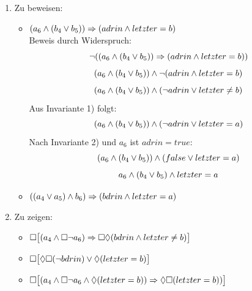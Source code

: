 \documentclass[a4paper,twoside,12pt]{article}
\begin{document}
\begin{description}
\begin{enumerate}
	\item Zu beweisen:
	\begin{itemize}
		\item $(a_6 \wedge (b_4 \vee b_5)) \Rightarrow (adrin \wedge letzter = b)$\\
			Beweis durch Widerspruch:
			\[ \neg((a_6 \wedge (b_4 \vee b_5)) \Rightarrow (adrin \wedge letzter = b)) \]
			\[ (a_6 \wedge (b_4 \vee b_5)) \wedge \neg (adrin \wedge letzter = b) \]
			\[ (a_6 \wedge (b_4 \vee b_5)) \wedge (\neg adrin \vee letzter \neq b) \]
			Aus Invariante 1) folgt:
			\[ (a_6 \wedge (b_4 \vee b_5)) \wedge (\neg adrin \vee letzter = a) \]
			Nach Invariante 2) und $a_6$ ist $adrin = true$:
			\[ (a_6 \wedge (b_4 \vee b_5)) \wedge (false \vee letzter = a) \]
			\[ a_6 \wedge (b_4 \vee b_5) \wedge letzter = a \]


		\item $((a_4 \vee a_5) \wedge b_6) \Rightarrow (bdrin \wedge letzter = a)$
	\end{itemize}
	\item Zu zeigen:
	\begin{itemize}
		\item $\Box \big [(a_4 \wedge \Box \neg a_6) \Rightarrow \Box \lozenge (bdrin \wedge letzter \neq b) \big ]$
		\item $\Box \big [\lozenge \Box (\neg bdrin) \vee \lozenge (letzter = b) \big]$
		\item $\Box \big [(a_4 \wedge \Box \neg a_6 \wedge \lozenge (letzter = b)) \Rightarrow \lozenge \Box (letzter = b)) \big ]$
	\end{itemize}
\end{enumerate}

\end{description}
\end{document}
